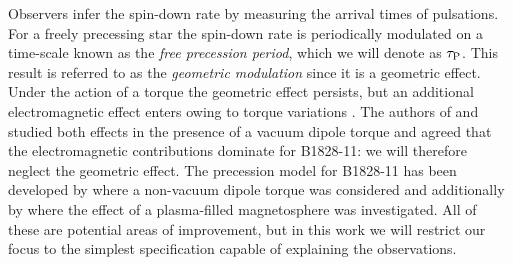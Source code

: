 \documentclass[../full_thesis/full_thesis.tex]{subfiles}
\begin{document}
Observers infer the spin-down rate by measuring the arrival times of
pulsations.
For a freely precessing star the spin-down rate is periodically modulated on a
time-scale known as the \emph{free precession period}, which we will denote as
$\tau_{\mathrm{P}}$.  This result is referred to as the \emph{geometric modulation}
\citep{Jones2001} since it is a geometric effect.  Under the action of a torque
the geometric effect persists, but an additional electromagnetic effect enters
owing to torque variations \citep{Cordes1993}. The authors of
\citet{Jones2001} and \citet{Link2001} studied both effects in the
presence of a vacuum dipole torque \citep{Davis1970} and agreed that the
electromagnetic contributions dominate for B1828-11: we will therefore neglect
the geometric effect. The precession model for
B1828-11 has been developed by \citet{Akgun2006} where a non-vacuum
dipole torque was considered and additionally by \citet{Arzamasskiy2015}
where the effect of a plasma-filled magnetosphere was investigated. All of these are
potential areas of improvement, but in this work we will restrict our focus
to the simplest specification capable of explaining the observations.
\end{document}
